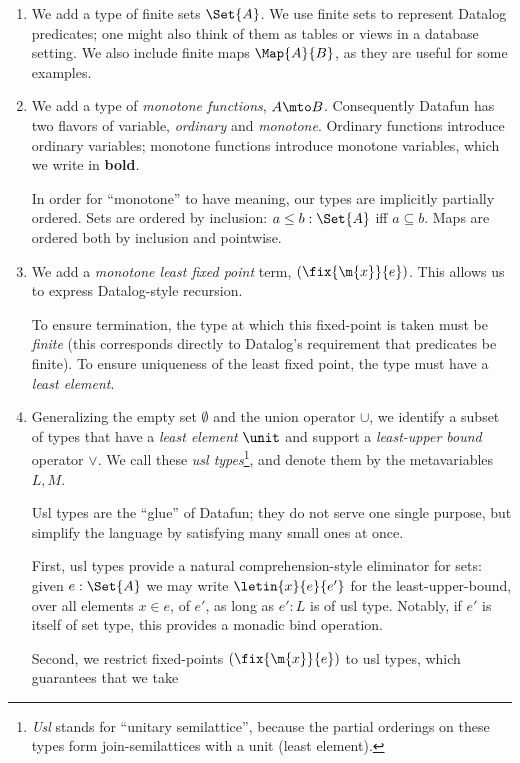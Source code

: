\documentclass[preprint]{sigplanconf}
\begin{document}
\begin{enumerate}
\item We add a type of finite sets $\Set{A}$. We use finite sets to represent
  Datalog predicates; one might also think of them as tables or views in a
  database setting. We also include finite maps $\Map{A}{B}$, as they are useful
  for some examples.


\item We add a type of \emph{monotone functions}, $A \mto B$. Consequently
  Datafun has two flavors of variable, \emph{ordinary} and \emph{monotone}.
  Ordinary functions introduce ordinary variables; monotone functions introduce
  monotone variables, which we write in \textbf{bold}.

  In order for ``monotone'' to have meaning, our types are implicitly partially
  ordered.  Sets are ordered by inclusion: $a \le b :
  \Set{A}$ iff $a \subseteq b$. Maps are ordered both by inclusion and
  pointwise.

\item We add a \emph{monotone least fixed point} term, $(\fix{\m{x}}{e})$. This
  allows us to express Datalog-style recursion.


  To ensure termination, the type at which this fixed-point is taken must be
  \emph{finite} (this corresponds directly to Datalog's requirement that
  predicates be finite). To ensure uniqueness of the least fixed point, the type
  must have a \emph{least element}.

\item Generalizing the empty set $\emptyset$ and the union operator $\cup$, we
  identify a subset of types that have a \emph{least element} $\unit$ and
  support a \emph{least-upper bound} operator $\vee$. We call these \emph{usl
    types}\footnote{\emph{Usl} stands for ``unitary semilattice'', because the
    partial orderings on these types form join-semilattices with a unit (least
    element).}, and denote them by the metavariables $L,M$.

  Usl types are the ``glue'' of Datafun; they do not serve one single purpose,
  but simplify the language by satisfying many small ones at once.

  First, usl types provide a natural comprehension-style eliminator for sets:
  given $e : \Set{A}$ we may write $\letin{x}{e}{e'}$ for the least-upper-bound,
  over all elements $x \in e$, of $e'$, as long as $e' : L$ is of usl type.
  Notably, if $e'$ is itself of set type, this provides a monadic bind
  operation. 

  Second, we restrict fixed-points $(\fix{\m{x}}{e})$ to usl types, which
  guarantees that we take



\end{enumerate}
\end{document}

